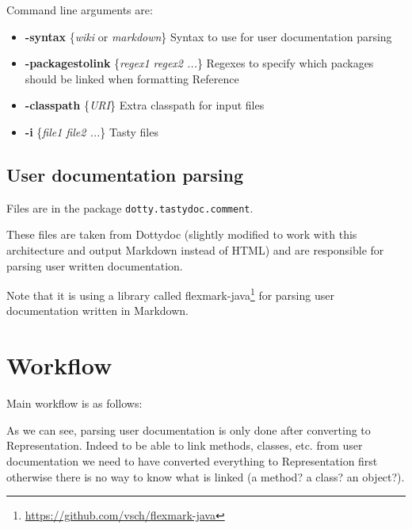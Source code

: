 \documentclass{report}
\begin{document}
Command line arguments are:
\begin{itemize}
    \item \textbf{-syntax} \{\textit{wiki} or \textit{markdown}\} Syntax to use for user documentation parsing
    \item \textbf{-packagestolink} \{\textit{regex1 regex2 ...}\} Regexes to specify which packages should be linked when formatting Reference
    \item \textbf{-classpath} \{\textit{URI}\} Extra classpath for input files
    \item \textbf{-i} \{\textit{file1 file2 ...}\} Tasty files
\end{itemize}

\subsection{User documentation parsing}
Files are in the package \texttt{dotty.tastydoc.comment}.

These files are taken from Dottydoc (slightly modified to work with this architecture and output Markdown instead of HTML) and are responsible for parsing user written documentation.

Note that it is using a library called flexmark-java\footnote{\url{https://github.com/vsch/flexmark-java}} for parsing user documentation written in Markdown.

\section{Workflow}
\label{sec:workflow}
Main workflow is as follows:

\begin{center}
\end{center}

As we can see, parsing user documentation is only done after converting to Representation. Indeed to be able to link methods, classes, etc. from user documentation we need to have converted everything to Representation first otherwise there is no way to know what is linked (a method? a class? an object?).
\end{document}
